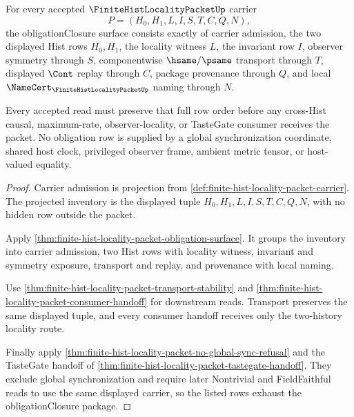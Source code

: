 \begin{theorem}
\label{thm:finite-hist-locality-packet-obligation-closure-package}
For every accepted $\FiniteHistLocalityPacketUp$ carrier
$$
P=(H_0,H_1,L,I,S,T,C,Q,N),
$$
the obligationClosure surface consists exactly of carrier admission, the two displayed Hist rows $H_0,H_1$, the locality witness $L$, the invariant row $I$, observer symmetry through $S$, componentwise $\hsame/\psame$ transport through $T$, displayed $\Cont$ replay through $C$, package provenance through $Q$, and local $\NameCert_{\FiniteHistLocalityPacketUp}$ naming through $N$.

Every accepted read must preserve that full row order before any cross-Hist causal, maximum-rate, observer-locality, or TasteGate consumer receives the packet. No obligation row is supplied by a global synchronization coordinate, shared host clock, privileged observer frame, ambient metric tensor, or host-valued equality.
\end{theorem}
\begin{proof}
Carrier admission is projection from \autoref{def:finite-hist-locality-packet-carrier}. The projected inventory is the displayed tuple $H_0,H_1,L,I,S,T,C,Q,N$, with no hidden row outside the packet.

Apply \autoref{thm:finite-hist-locality-packet-obligation-surface}. It groups the inventory into carrier admission, two Hist rows with locality witness, invariant and symmetry exposure, transport and replay, and provenance with local naming.

Use \autoref{thm:finite-hist-locality-packet-transport-stability} and \autoref{thm:finite-hist-locality-packet-consumer-handoff} for downstream reads. Transport preserves the same displayed tuple, and every consumer handoff receives only the two-history locality route.

Finally apply \autoref{thm:finite-hist-locality-packet-no-global-sync-refusal} and the TasteGate handoff of \autoref{thm:finite-hist-locality-packet-tastegate-handoff}. They exclude global synchronization and require later Nontrivial and FieldFaithful reads to use the same displayed carrier, so the listed rows exhaust the obligationClosure package.
\end{proof}

